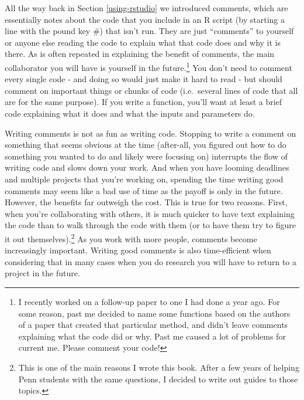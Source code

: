 \documentclass[
  12pt,
]{book}
\begin{document}
All the way back in Section \ref{using-rstudio} we introduced comments, which are essentially notes about the code that you include in an R script (by starting a line with the pound key \#) that isn't run. They are just ``comments'' to yourself or anyone else reading the code to explain what that code does and why it is there. As is often repeated in explaining the benefit of comments, the main collaborator you will have is yourself in the future.\footnote{I recently worked on a follow-up paper to one I had done a year ago. For some reason, past me decided to name some functions based on the authors of a paper that created that particular method, and didn't leave comments explaining what the code did or why. Past me caused a lot of problems for current me. Please comment your code!} You don't need to comment every single code - and doing so would just make it hard to read - but should comment on important things or chunks of code (i.e.~several lines of code that all are for the same purpose). If you write a function, you'll want at least a brief code explaining what it does and what the inputs and parameters do.

Writing comments is not as fun as writing code. Stopping to write a comment on something that seems obvious at the time (after-all, you figured out how to do something you wanted to do and likely were focusing on) interrupts the flow of writing code and slows down your work. And when you have looming deadlines and multiple projects that you're working on, spending the time writing good comments may seem like a bad use of time as the payoff is only in the future. However, the benefits far outweigh the cost. This is true for two reasons. First, when you're collaborating with others, it is much quicker to have text explaining the code than to walk through the code with them (or to have them try to figure it out themselves).\footnote{This is one of the main reasons I wrote this book. After a few years of helping Penn students with the same questions, I decided to write out guides to those topics.} As you work with more people, comments become increasingly important. Writing good comments is also time-efficient when considering that in many cases when you do research you will have to return to a project in the future.
\end{document}
